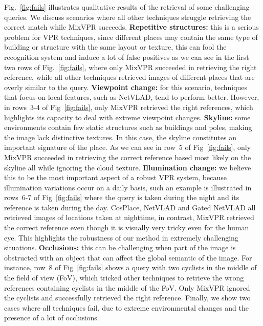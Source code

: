 \documentclass[10pt,twocolumn,letterpaper]{article}
\begin{document}
Fig.~\ref{fig:fails} illustrates qualitative results of the retrieval of some challenging queries. We discuss  scenarios where all other techniques struggle retrieving the correct match while MixVPR succeeds. \textbf{Repetitive structures:} this is a serious problem for VPR techniques, since different places may contain the same type of building or structure with the same layout or texture, this can fool the recognition system and induce a lot of false positives as we can see in the first two rows of Fig.~\ref{fig:fails}, where only MixVPR succeeded in retrieving the right reference, while all other techniques retrieved images of different places that are overly similar to the query. \textbf{Viewpoint change:} for this scenario, techniques that focus on local features, such as NetVLAD, tend to perform better. However, in rows~3-4 of Fig~\ref{fig:fails}, only MixVPR retrieved the right references, which highlights its capacity to deal with extreme viewpoint changes. \textbf{Skyline:} some environments contain few static structures such as buildings and poles, making the image lack distinctive textures. In this case, the skyline constitutes an important signature of the place. As we can see in row~5 of Fig~\ref{fig:fails}, only MixVPR succeeded in retrieving the correct reference based most likely on the skyline all while ignoring the cloud texture. \textbf{Illumination change:} we believe this to be the most important aspect of a robust VPR system, because illumination variations occur on a daily basis, such an example is illustrated in rows~6-7 of Fig~\ref{fig:fails} where the query is taken during the night and its reference is taken during the day. CosPlace, NetVLAD and Gated NetVLAD all retrieved images of locations taken at nighttime, in contrast, MixVPR retrieved the correct reference even though it is visually very tricky even for the human eye. This highlights the robustness of our method in extremely challenging situations. \textbf{Occlusions:} this can be challenging when part of the image is obstructed with an object that can affect the global semantic of the image. For instance, row~8 of Fig~\ref{fig:fails} shows a query with two cyclists in the middle of the field of view (FoV), which tricked other techniques to retrieve the wrong references containing cyclists in the middle of the FoV. Only MixVPR ignored the cyclists and successfully retrieved the right reference. Finally, we show two cases where all techniques fail, due to extreme environmental changes and the presence of a lot of  occlusions.
\end{document}
